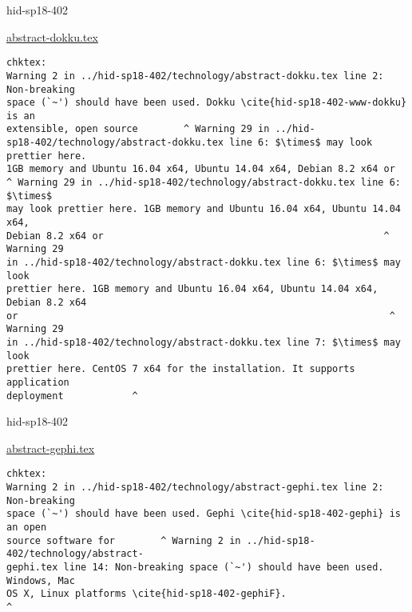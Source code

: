 \begin{IU}

hid-sp18-402

\href{https://github.com/cloudmesh-community/hid-sp18-402/blob/master//technology/abstract-dokku.tex}{abstract-dokku.tex}

\begin{tiny}
\begin{verbatim}
chktex:
Warning 2 in ../hid-sp18-402/technology/abstract-dokku.tex line 2: Non-breaking
space (`~') should have been used. Dokku \cite{hid-sp18-402-www-dokku} is an
extensible, open source        ^ Warning 29 in ../hid-
sp18-402/technology/abstract-dokku.tex line 6: $\times$ may look prettier here.
1GB memory and Ubuntu 16.04 x64, Ubuntu 14.04 x64, Debian 8.2 x64 or
^ Warning 29 in ../hid-sp18-402/technology/abstract-dokku.tex line 6: $\times$
may look prettier here. 1GB memory and Ubuntu 16.04 x64, Ubuntu 14.04 x64,
Debian 8.2 x64 or                                                 ^ Warning 29
in ../hid-sp18-402/technology/abstract-dokku.tex line 6: $\times$ may look
prettier here. 1GB memory and Ubuntu 16.04 x64, Ubuntu 14.04 x64, Debian 8.2 x64
or                                                                 ^ Warning 29
in ../hid-sp18-402/technology/abstract-dokku.tex line 7: $\times$ may look
prettier here. CentOS 7 x64 for the installation. It supports application
deployment            ^
\end{verbatim}
\end{tiny}
\end{IU}



\begin{IU}

hid-sp18-402

\href{https://github.com/cloudmesh-community/hid-sp18-402/blob/master//technology/abstract-gephi.tex}{abstract-gephi.tex}

\begin{tiny}
\begin{verbatim}
chktex:
Warning 2 in ../hid-sp18-402/technology/abstract-gephi.tex line 2: Non-breaking
space (`~') should have been used. Gephi \cite{hid-sp18-402-gephi} is an open
source software for        ^ Warning 2 in ../hid-sp18-402/technology/abstract-
gephi.tex line 14: Non-breaking space (`~') should have been used. Windows, Mac
OS X, Linux platforms \cite{hid-sp18-402-gephiF}.
^
\end{verbatim}
\end{tiny}
\end{IU}

